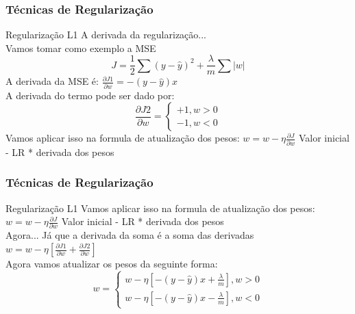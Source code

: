 \documentclass{beamer}
\begin{document}
\begin{frame}
	\frametitle{Técnicas de Regularização}
	\begin{block}{Regularização L1}
		A derivada da regularização... \\
		Vamos tomar como exemplo a MSE
		$$J = \frac{1}{2} \sum (y - \hat{y})^2 + \frac{\lambda}{m} \sum |w|$$
		A derivada da MSE é:
		$\frac{\partial J1}{\partial w} = -(y - \hat{y})x$ \\
		A derivada do termo pode ser dado por:
		$$\frac{\partial J2}{\partial w} =  \left\{\begin{matrix}
			+1, w > 0
			\\ 
			-1, w < 0
		\end{matrix}\right.$$
	Vamos aplicar isso na formula de atualização dos pesos:
	$w = w - \eta \frac{\partial J}{\partial w}$ Valor inicial - LR * derivada dos pesos 
	\end{block}
\end{frame}

\begin{frame}
	\frametitle{Técnicas de Regularização}
	\begin{block}{Regularização L1}
		Vamos aplicar isso na formula de atualização dos pesos:
		$w = w - \eta \frac{\partial J}{\partial w}$ Valor inicial - LR * derivada dos pesos \\
		Agora... Já que a derivada da soma é a soma das derivadas \\
		$w = w - \eta [\frac{\partial J1}{\partial w} + \frac{\partial J2}{\partial w}]$ \\
		Agora vamos atualizar os pesos da seguinte forma:
		$$w =  \left\{\begin{matrix}
			w - \eta [-(y-\hat{y})x + \frac{\lambda}{m}], w > 0
			\\ 
			w - \eta [-(y-\hat{y})x - \frac{\lambda}{m}], w < 0
		\end{matrix}\right.$$
	\end{block}
\end{frame}
\end{document}
